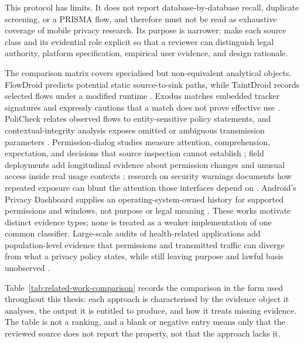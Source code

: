 This protocol has limits. It does not report database-by-database recall, duplicate screening, or a PRISMA flow, and therefore must not be read as exhaustive coverage of mobile privacy research. Its purpose is narrower: make each source class and its evidential role explicit so that a reviewer can distinguish legal authority, platform specification, empirical user evidence, and design rationale.

The comparison matrix covers specialised but non-equivalent analytical objects. FlowDroid predicts potential static source-to-sink paths, while TaintDroid records selected flows under a modified runtime \cite{flowdroid2014,taintdroid2010}. Exodus matches embedded tracker signatures and expressly cautions that a match does not prove effective use \cite{exodusTrackerDetection}. PoliCheck relates observed flows to entity-sensitive policy statements, and contextual-integrity analysis exposes omitted or ambiguous transmission parameters \cite{policheck2020,shvartzshnaider2019}. Permission-dialog studies measure attention, comprehension, expectation, and decisions that source inspection cannot establish \cite{felt2012,bonne2017,cao2021}; field deployments add longitudinal evidence about permission changes and unusual access inside real usage contexts \cite{wijesekera2015,prange2024}; research on security warnings documents how repeated exposure can blunt the attention those interfaces depend on \cite{bravolillo2013attention,sunshine2009cryingwolf}. Android's Privacy Dashboard supplies an operating-system-owned history for supported permissions and windows, not purpose or legal meaning \cite{androidPrivacyDashboard}. These works motivate distinct evidence types; none is treated as a weaker implementation of one common classifier. Large-scale audits of health-related applications add population-level evidence that permissions and transmitted traffic can diverge from what a privacy policy states, while still leaving purpose and lawful basis unobserved \cite{tangari2021}.

Table~\ref{tab:related-work-comparison} records the comparison in the form used throughout this thesis: each approach is characterised by the evidence object it analyses, the output it is entitled to produce, and how it treats missing evidence. The table is not a ranking, and a blank or negative entry means only that the reviewed source does not report the property, not that the approach lacks it.

